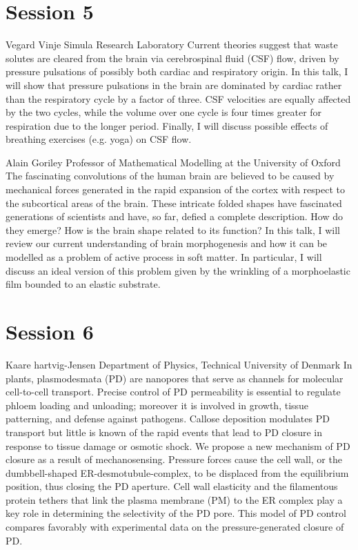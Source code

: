 \documentclass{article}
\begin{document}
\newpage
\section*{Session 5}

{Vegard Vinje}
{Simula Research Laboratory}
{Current theories suggest that waste solutes are cleared from the brain
via cerebrospinal fluid (CSF) flow, driven by pressure pulsations of
possibly both cardiac and respiratory origin. In this talk, I will show
that pressure pulsations in the brain are dominated by cardiac rather
than the respiratory cycle by a factor of three. CSF velocities are
equally affected by the two cycles, while the volume over one cycle is
four times greater for respiration due to the longer period. Finally, I
will discuss possible effects of breathing exercises (e.g. yoga) on CSF
flow.}

{Alain Goriley}
{Professor of Mathematical Modelling at the University of Oxford}
{The fascinating convolutions of the human brain are believed to be caused by
mechanical forces generated in the rapid expansion of the cortex with respect to the
subcortical areas of the brain. These intricate folded shapes have fascinated generations
of scientists and have, so far, defied a complete description. How do they emerge? How is
the brain shape related to its function? In this talk, I will review our current
understanding of brain morphogenesis and how it can be modelled as a problem of active
process in soft matter. In particular, I will discuss an ideal version of this problem
given by the wrinkling of a morphoelastic film bounded to an elastic substrate.}

\newpage
\section*{Session 6}

{Kaare hartvig-Jensen}
{Department of Physics, Technical University of Denmark}
{In plants, plasmodesmata (PD) are nanopores that serve as channels for molecular
cell-to-cell transport. Precise control of PD permeability is essential to regulate phloem
loading and unloading; moreover it is involved in growth, tissue patterning, and defense
against pathogens. Callose deposition modulates PD transport but little is known of the
rapid events that lead to PD closure in response to tissue damage or osmotic shock. We
propose a new mechanism of PD closure as a result of mechanosensing. Pressure forces cause
the cell wall, or the dumbbell-shaped ER-desmotubule-complex, to be displaced from the
equilibrium position, thus closing the PD aperture. Cell wall elasticity and the
filamentous protein tethers that link the plasma membrane (PM) to the ER complex play a
key role in determining the selectivity of the PD pore. This model of PD control compares
favorably with experimental data on the pressure-generated closure of PD.}
\end{document}
